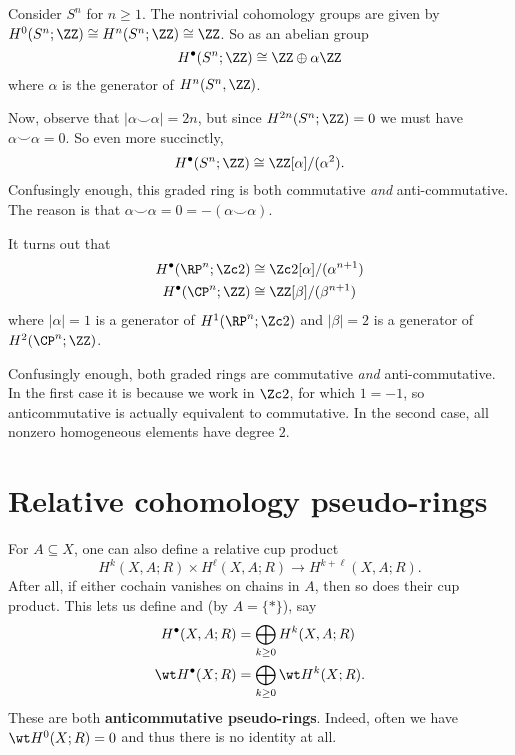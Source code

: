 \begin{example}
	Consider $S^n$ for $n \ge 1$.
	The nontrivial cohomology groups are given by
	$H^0(S^n; \ZZ) \cong H^n(S^n; \ZZ) \cong \ZZ$.
	So as an abelian group
	\[ H^\bullet(S^n; \ZZ) \cong \ZZ \oplus \alpha \ZZ \]
	where $\alpha$ is the generator of $H^n(S^n, \ZZ)$.

	Now, observe that $|\alpha\smile\alpha| = 2n$, but
	since $H^{2n}(S^n; \ZZ) = 0$ we must have $\alpha\smile\alpha=0$.
	So even more succinctly,
	\[ H^\bullet(S^n; \ZZ) \cong \ZZ[\alpha]/(\alpha^2). \]
	Confusingly enough, this graded ring is both
	commutative \emph{and} anti-commutative.
	The reason is that $\alpha \smile \alpha = 0 = -(\alpha \smile \alpha)$.
\end{example}

\begin{example}
	It turns out that
	\begin{align*}
		H^\bullet(\RP^n; \Zc2) &\cong \Zc2[\alpha]/(\alpha^{n+1}) \\
		H^\bullet(\CP^n; \ZZ) &\cong \ZZ[\beta]/(\beta^{n+1})
	\end{align*}
	where $|\alpha| = 1$ is a generator of $H^1(\RP^n; \Zc2)$
	and $|\beta| = 2$ is a generator of $H^2(\CP^n; \ZZ)$.

	Confusingly enough, both graded rings are commutative \emph{and} anti-commutative.
	In the first case it is because we work in $\Zc 2$, for which $1 = -1$,
	so anticommutative is actually equivalent to commutative.
	In the second case, all nonzero homogeneous elements have degree $2$.
\end{example}


\section{Relative cohomology pseudo-rings}
For $A \subseteq X$, one can also define a relative cup product
\[ H^k(X,A;R) \times H^\ell(X,A;R) \to H^{k+\ell}(X,A;R). \]
After all, if either cochain vanishes on chains in $A$,
then so does their cup product.
This lets us define 
and  (by $A = \{\ast\}$), say
\begin{align*}
H^\bullet(X,A;R) &= \bigoplus_{k \ge 0} H^k(X,A; R) \\
\wt H^\bullet(X;R) &= \bigoplus_{k \ge 0} \wt H^k(X;R).
\end{align*}
These are both \textbf{anticommutative pseudo-rings}.
Indeed, often we have $\wt H^0(X;R) = 0$ and thus there is no identity at all.

